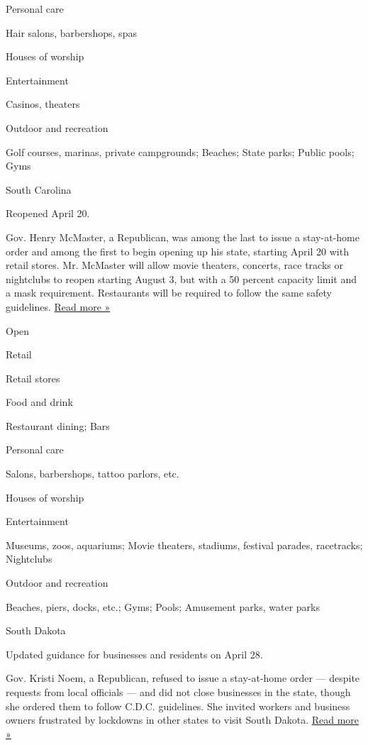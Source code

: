 Personal care

Hair salons, barbershops, spas

Houses of worship

Entertainment

Casinos, theaters

Outdoor and recreation

Golf courses, marinas, private campgrounds; Beaches; State parks; Public
pools; Gyms

South Carolina

Reopened April 20.

Gov. Henry McMaster, a Republican, was among the last to issue a
stay-at-home order and among the first to begin opening up his state,
starting April 20 with retail stores. Mr. McMaster will allow movie
theaters, concerts, race tracks or nightclubs to reopen starting August
3, but with a 50 percent capacity limit and a mask requirement.
Restaurants will be required to follow the same safety guidelines.
\href{https://www.wbtv.com/2020/07/29/sc-governor-announces-targeted-mask-requirements-reopens-more-businesses/}{Read
more »}

Open

Retail

Retail stores

Food and drink

Restaurant dining; Bars

Personal care

Salons, barbershops, tattoo parlors, etc.

Houses of worship

Entertainment

Museums, zoos, aquariums; Movie theaters, stadiums, festival parades,
racetracks; Nightclubs

Outdoor and recreation

Beaches, piers, docks, etc.; Gyms; Pools; Amusement parks, water parks

South Dakota

Updated guidance for businesses and residents on April 28.

Gov. Kristi Noem, a Republican, refused to issue a stay-at-home order
--- despite requests from local officials --- and did not close
businesses in the state, though she ordered them to follow C.D.C.
guidelines. She invited workers and business owners frustrated by
lockdowns in other states to visit South Dakota.
\href{https://www.usnews.com/news/best-states/south-dakota/articles/2020-04-28/south-dakota-governor-to-unveil-plan-to-reopen-state}{Read
more »}

